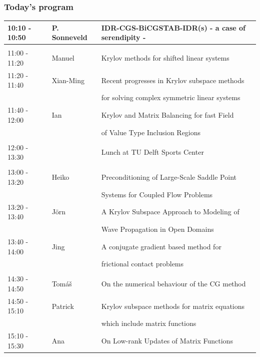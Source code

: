 \documentclass{beamer}
\begin{document}
\begin{frame}
\frametitle{Today's program}
\vspace{-0.2cm}
\tiny
\begin{table}[h]
\begin{tabular}{lll}
10:10 - 10:50 & P. Sonneveld & IDR-CGS-BiCGSTAB-IDR(s) - a case of serendipity -\\ [0.5ex]
\hline \\ [-1.5ex]
11:00 - 11:20 & Manuel & Krylov methods for shifted linear systems \\ [0.5ex]
11:20 - 11:40 & Xian-Ming & Recent progresses in Krylov subspace methods\\ 
                        & & for solving complex symmetric linear systems\\  [0.5ex]
11:40 - 12:00 & Ian & Krylov and Matrix Balancing for fast Field \\ 
              &     & of Value Type Inclusion Regions\\  [0.5ex]
\hline \\ [-1.5ex]
12:00 - 13:30 & & Lunch at TU Delft Sports Center \\ [0.5ex]
\hline \\ [-1.5ex]
13:00 - 13:20 & Heiko & Preconditioning of Large-Scale Saddle Point \\
                    & & Systems for Coupled Flow Problems\\ [0.5ex]
13:20 - 13:40 &J\"orn & A Krylov Subspace Approach to Modeling of \\
                     & & Wave Propagation in Open Domains\\ [0.5ex]
13:40 - 14:00 & Jing & A conjugate gradient based method for \\
                   & & frictional contact problems\\ [0.5ex]
\hline \\ [-1.5ex]
14:30 - 14:50 & Tom{\'a}{\v s} & On the numerical behaviour of the CG method\\ [0.5ex]
14:50 - 15:10 & Patrick & Krylov subspace methods for matrix equations \\
                  & & which include matrix functions\\ [0.5ex]
15:10 - 15:30 & Ana & On Low-rank Updates of Matrix Functions\\ [0.5ex]

\end{tabular}
\end{table}
\end{frame}
\end{document}
